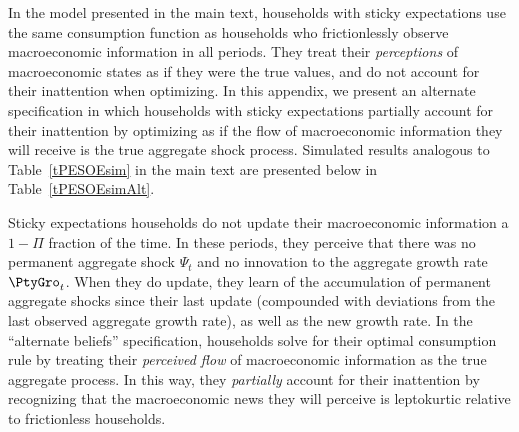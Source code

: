 In the model presented in the main text, households with sticky expectations use the same consumption function as households who frictionlessly observe macroeconomic information in all periods.  They treat their \textit{perceptions} of macroeconomic states as if they were the true values, and do not account for their inattention when optimizing.  In this appendix, we present an alternate specification in which households with sticky expectations partially account for their inattention by optimizing as if the flow of macroeconomic information they will receive is the true aggregate shock process.  Simulated results analogous to Table~\ref{tPESOEsim} in the main text are presented below in Table~\ref{tPESOEsimAlt}.

Sticky expectations households do not update their macroeconomic information a $1-\Pi$ fraction of the time. In these periods, they perceive that there was no permanent aggregate shock $\Psi_t$ and no innovation to the aggregate growth rate $\PtyGro_t$.  When they do update, they learn of the accumulation of permanent aggregate shocks since their last update (compounded with deviations from the last observed aggregate growth rate), as well as the new growth rate.  In the ``alternate beliefs'' specification, households solve for their optimal consumption rule by treating their \textit{perceived flow} of macroeconomic information as the true aggregate process.  In this way, they \textit{partially} account for their inattention by recognizing that the macroeconomic news they will perceive is leptokurtic relative to frictionless households. 

